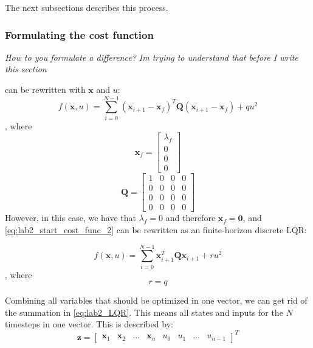 \documentclass[../main.tex]{subfiles}
\begin{document}
The next subsections describes this process.

\subsubsection{Formulating the cost function} \label{sec:lab2_cost_func}
\textit{How to you formulate a difference? Im trying to understand that before I write this section}

 can be rewritten with $ \bm x $ and $ u $:
\begin{equation}\label{eq:lab2_start_cost_func_2}
	f(\bm x, u) = \sum_{i=0}^{N-1} \left( \bm x_{i+1} - \bm x_f \right)^T \bm Q \left( \bm x_{i+1} - \bm x_f \right) + q u^2
\end{equation}, where
\begin{equation}\label{eq:lab2_lambda_f}
	\bm x_f = \begin{bmatrix}
		\lambda_f \\ 0 \\ 0 \\ 0
	\end{bmatrix}
\end{equation}
\begin{equation}\label{eq:lab2_Q}
	\bm Q = \begin{bmatrix}
		1 & 0 & 0 & 0 \\
		0 & 0 & 0 & 0 \\
		0 & 0 & 0 & 0 \\
		0 & 0 & 0 & 0
	\end{bmatrix}
\end{equation}
However, in this case, we have that $ \lambda_f = 0 $ and therefore $ \bm x_f = \bm 0 $, and \cref{eq:lab2_start_cost_func_2} can be rewritten as an finite-horizon discrete LQR:

\begin{equation}\label{eq:lab2_LQR}
	f(\bm x, u) = \sum_{i=0}^{N-1} \bm x_{i+1}^T \bm Q \bm x_{i+1} + r u^2
\end{equation}
, where
\begin{equation}\label{eq:lab2_R}
	r = q
\end{equation}

Combining all variables that should be optimized in one vector, we can get rid of the summation in \cref{eq:lab2_LQR}. This means all states and inputs for the $ N $ timesteps in one vector. This is described by:
\begin{equation}\label{eq:lab2_z}
	\bm z = \begin{bmatrix}
		\bm x_1 & \bm x_2 & ... & \bm x_n & u_0 & u_1 &... & u_{n-1} 
	\end{bmatrix}^T
\end{equation}
\end{document}
